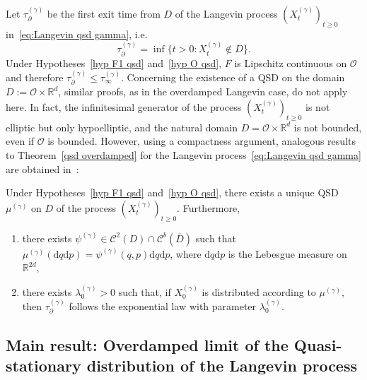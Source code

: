 \documentclass[preprint,EJP]{ejpecp}
\begin{document}
Let $\tau^{(\gamma)}_{\partial}$ be the first exit time from $D$ of the Langevin process $(X^{(\gamma)}_t)_{t\geq0}$ in~\eqref{eq:Langevin qsd gamma}, i.e.  $$\tau^{(\gamma)}_{\partial}=\inf \{t>0: X^{(\gamma)}_t\notin D\} .$$
Under Hypotheses~\ref{hyp F1 qsd} and~\ref{hyp O qsd}, $F$ is Lipschitz continuous on $\mathcal{O}$ and therefore $\tau^{(\gamma)}_\partial \leq \tau^{(\gamma)}_\infty$. 
 Concerning the existence of a QSD on the domain $D:=\mathcal{O}\times\mathbb{R}^d$, similar proofs, as in the overdamped Langevin case, do not apply here. In fact, the infinitesimal generator of the process $(X^{(\gamma)}_t)_{t\geq0}$ is not elliptic but only hypoelliptic, and the natural domain $D = \mathcal{O} \times \mathbb{R}^d$ is not bounded, even if $\mathcal{O}$ is bounded. However, using a compactness argument, analogous results to Theorem~\ref{qsd overdamped} for the Langevin process~\eqref{eq:Langevin qsd gamma} are obtained in~\cite{LelRamRey2}:  
\begin{theorem}\label{thm:qsd langevin} Under Hypotheses~\ref{hyp F1 qsd} and~\ref{hyp O qsd}, there exists a unique QSD $\mu^{(\gamma)}$ on $D$ of the process $(X^{(\gamma)}_t)_{t\geq0}$. Furthermore, 
\begin{enumerate} 
\item there exists $\psi^{(\gamma)}\in\mathcal{C}^2(D)\cap\mathcal{C}^b(\overline{D})$ such that $\mu^{(\gamma)}(\mathrm{d}q\mathrm{d}p)=\psi^{(\gamma)}(q,p)\mathrm{d}q\mathrm{d}p$, where $\mathrm{d}q\mathrm{d}p$ is the Lebesgue measure on~$\mathbb{R}^{2d}$,
\item there exists $\lambda^{(\gamma)}_0>0$ such that, if $X^{(\gamma)}_0$ is distributed according to $\mu^{(\gamma)}$, then $\tau^{(\gamma)}_\partial$ follows the exponential law with parameter $\lambda^{(\gamma)}_0$.
\end{enumerate}
\end{theorem} 
  

\subsection{Main result: Overdamped limit of the Quasi-stationary distribution of the Langevin process} \label{Main results_overdamped}  
\end{document}
